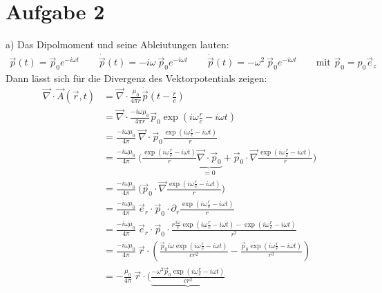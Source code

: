 \documentclass[11pt a4paper]{article}
\newcommand{\del}{\partial}
\newcommand{\diver}{\vec \nabla \cdot}
\begin{document}
\newpage
\setlength{\headheight}{0cm}
\section*{Aufgabe 2}
a) Das Dipolmoment und seine Ableiutungen lauten:
\begin{align*}
	\vec p(t) 
	= \vec p_0 e^{-i\omega t}
	\qquad
	\dot{\vec p}(t) 
	= -i\omega \ \vec p_0 e^{-i\omega t}
	\qquad
	\ddot{\vec p}(t) 
	= -\omega^2 \ \vec p_0 e^{-i\omega t}
	\qquad \text{mit }
	\vec p_0 = p_0 \vec e_z
\end{align*}
Dann lässt sich für die Divergenz des Vektorpotentials zeigen:
\begin{align*}
	\diver \vec A(\vec r, t)
	&= \diver \frac{\mu_0}{4\pi r} \dot{\vec p} \left(t - \frac rc\right) \\
	&= \diver \frac{-i \omega \mu_0}{4\pi r} \vec p_0 \exp \left( i\omega \frac rc - i\omega t \right) \\
	&= 
		\frac{-i \omega \mu_0}{4\pi}  \
		\diver \vec p_0 \frac{\exp\left(i\omega\frac rc - i\omega t\right)}{r} \\
	&= 
		\frac{-i \omega \mu_0}{4\pi}  \
		\Bigg (
			\frac{\exp\left(i\omega\frac rc - i\omega t\right)}{r}  
			\underbrace{\diver \vec p_0}_{=0}
			+ \vec p_0 \cdot \vec \nabla \frac{\exp\left(i\omega\frac rc - i\omega t\right)}{r}
		\Bigg ) \\
	&= 
		\frac{-i \omega \mu_0}{4\pi}  \
		\Bigg (
			\vec p_0 \cdot \vec \nabla \frac{\exp\left(i\omega\frac rc - i\omega t\right)}{r}
		\Bigg ) \\
	&= 
		\frac{-i \omega \mu_0}{4\pi}  \ \vec e_r \cdot \vec p_0 \cdot
		 \del_r \frac{\exp\left(i\omega\frac rc - i\omega t\right)}{r} \\
	&= 
		\frac{-i \omega \mu_0}{4\pi}  \ \vec e_r \cdot \vec p_0 \cdot
		 \frac{r 
		 	\frac{i\omega}{c} \exp\left(i\omega\frac rc - i\omega t\right)
		 	- \exp\left(i\omega\frac rc - i\omega t\right)}{r^2} \\
	&= 
		\frac{-i \omega \mu_0}{4\pi}  \ \vec r \cdot 
		\left(
		 \frac{\vec p_0 i\omega \exp\left(i\omega\frac rc - i\omega t\right)}{c r^2}
		 - \frac{\vec p_0 \exp\left(i\omega\frac rc - i\omega t\right)}{r^3}
		\right) \\
	&= 
		- \frac{\mu_0}{4\pi}  \ \vec r \cdot 
		\Bigg(
		 \underbrace{\frac{-\omega^2 \vec p_0 \exp\left(i\omega\frac rc - i\omega t\right)}{c r^2}}

\end{align*}
\end{document}
